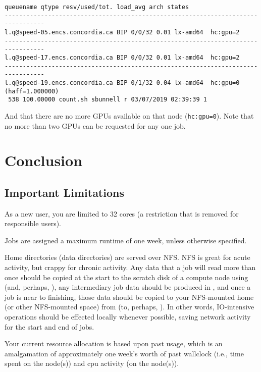 \documentclass{easychair}
\begin{document}
\small
\begin{verbatim}
queuename qtype resv/used/tot. load_avg arch states 
--------------------------------------------------------------------------------- 
l.q@speed-05.encs.concordia.ca BIP 0/0/32 0.01 lx-amd64  hc:gpu=2 
--------------------------------------------------------------------------------- 
l.q@speed-17.encs.concordia.ca BIP 0/0/32 0.01 lx-amd64  hc:gpu=2 
--------------------------------------------------------------------------------- 
l.q@speed-19.encs.concordia.ca BIP 0/1/32 0.04 lx-amd64  hc:gpu=0 (haff=1.000000) 
 538 100.00000 count.sh sbunnell r 03/07/2019 02:39:39 1
\end{verbatim}
\normalsize

And that there are no more GPUs available on that node (\texttt{hc:gpu=0}). Note that no 
more than two GPUs can be requested for any one job. 

\section{Conclusion}
\label{sect:conclusion}

\subsection{Important Limitations}
\label{sect:limitations}

As a new user, you are limited to 32 cores (a restriction that is removed for responsible users).

Jobs are assigned a maximum runtime of one week, unless otherwise specified. 

Home directories (data directories) are served over NFS. NFS is great for acute  activity, but crappy for chronic activity. Any data that a job will read more than once should be copied at the start to the scratch disk of a compute node using  (and, perhaps, ), any intermediary job data should be produced in , and once a job is near to finishing, those data should be copied to your NFS-mounted home (or other NFS-mounted space) from  (to, perhaps, ). In other words, IO-intensive operations should be effected locally whenever possible, saving network activity for the start and end of jobs. 

Your current resource allocation is based upon past usage, which is an amalgamation of approximately one week's worth of past wallclock (i.e., time spent on the node(s)) and cpu activity (on the node(s)).
\end{document}
